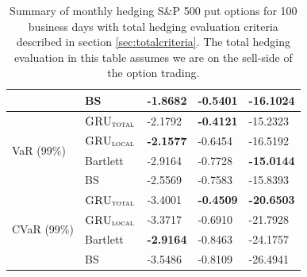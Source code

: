 \documentclass[letterpaper,12pt,titlepage,oneside,final]{book}
\numberwithin{equation}{section}
\theoremstyle{definition}
\newcommand{\modelT}{\textsc{GRU}_{\textsc{total}}}
\newcommand{\modelL}{\textsc{GRU}_{\textsc{local}}}
\begin{document}
\begin{table}[htp!]
\begin{tabular}{ll|l|l|l|}
		\multicolumn{1}{|l|}{}                                & BS       & -1.8682          & -0.5401          & -16.1024          \\ \hline
		\multicolumn{1}{|l|}{\multirow{4}{*}{VaR (99\%)}}     & $\modelT$    & -2.1792          & \textbf{-0.4121} & -15.2323          \\  
		\multicolumn{1}{|l|}{}                                & $\modelL$    & \textbf{-2.1577} & -0.6454          & -16.5192          \\  
		\multicolumn{1}{|l|}{}                                & Bartlett & -2.9164          & -0.7728          & \textbf{-15.0144} \\  
		\multicolumn{1}{|l|}{}                                & BS       & -2.5569          & -0.7583          & -15.8393          \\ \hline
		\multicolumn{1}{|l|}{\multirow{4}{*}{CVaR (99\%)}}    & $\modelT$    & -3.4001          & \textbf{-0.4509}  & \textbf{-20.6503} \\  
		\multicolumn{1}{|l|}{}                                & $\modelL$    & -3.3717          & -0.6910          & -21.7928          \\  
		\multicolumn{1}{|l|}{}                                & Bartlett & \textbf{-2.9164} & -0.8463          & -24.1757          \\  
		\multicolumn{1}{|l|}{}                                & BS       & -3.5486          & -0.8109          & -26.4941          \\ \hline
	\end{tabular}
	\caption{Summary of monthly hedging S\&P 500 put options for 100 business days with total hedging evaluation criteria described in section \ref{sec:totalcriteria}. The total hedging evaluation in this table assumes we are on the sell-side of the option trading.}
	\label{table:putTotalM}
\end{table}
\end{document}
